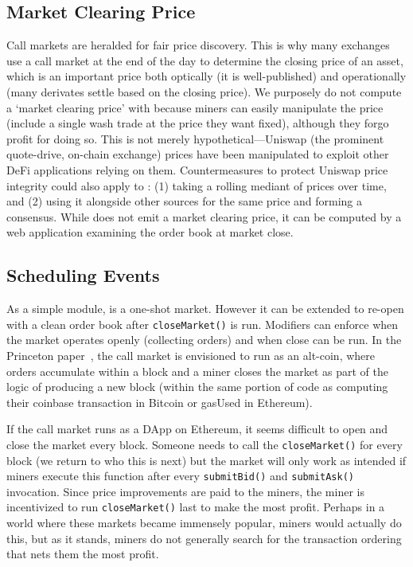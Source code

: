 \subsection{Market Clearing Price}

Call markets are heralded for fair price discovery. This is why many exchanges use a call market at the end of the day to determine the closing price of an asset, which is an important price both optically (it is well-published) and operationally (many derivates settle based on the closing price). We purposely do not compute a `market clearing price' with \cm because miners can easily manipulate the price (\ie include a single wash trade at the price they want fixed), although they forgo profit for doing so. This is not merely hypothetical---Uniswap (the prominent quote-drive, on-chain exchange) prices have been manipulated to exploit other DeFi applications relying on them. Countermeasures to protect Uniswap price integrity could also apply to \cm: (1) taking a rolling mediant of prices over time, and (2) using it alongside other sources for the same price and forming a consensus. While \cm does not emit a market clearing price, it can be computed by a web application examining the order book at market close. 

\subsection{Scheduling Events}

As a simple module, \cm is a one-shot market. However it can be extended to re-open with a clean order book after \texttt{closeMarket()} is run. Modifiers can enforce when the market operates openly (collecting orders) and when close can be run. In the Princeton paper~\cite{clark2014decentralizing}, the call market is envisioned to run as an alt-coin, where orders accumulate within a block and a miner closes the market as part of the logic of producing a new block (\ie within the same portion of code as computing their coinbase transaction in Bitcoin or gasUsed in Ethereum). 

If the call market runs as a DApp on Ethereum, it seems difficult to open and close the market every block. Someone needs to call the \texttt{closeMarket()} for every block (we return to who this is next) but the market will only work as intended if miners execute this function after every \texttt{submitBid()} and \texttt{submitAsk()} invocation. Since price improvements are paid to the miners, the miner is incentivized to run \texttt{closeMarket()} last to make the most profit. Perhaps in a world where these markets became immensely popular, miners would actually do this, but as it stands, miners do not generally search for the transaction ordering that nets them the most profit.

